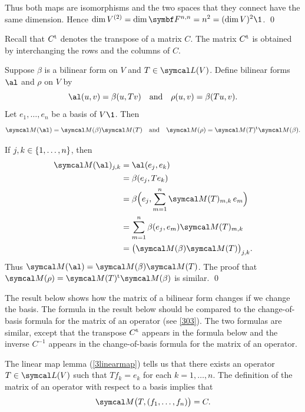 Thus both maps are isomorphisms and the two spaces that they connect have the same dimension. Hence
$\dim V^{(2)} = \dim \F{n,n} = n^2 = (\dim V)^2\1$.
\qed

Recall that $C^{\text{t}}$ denotes the transpose of a matrix $C$. The matrix $C^{\text{t}}$ is obtained by interchanging the rows and the columns of $C$.

{Suppose $\beta$ is a bilinear form on $V$ and $T \in \L(V)$. Define bilinear forms $\al$ and $\rho$ on $V$ by
\[
\al(u,v) = \beta(u, Tv) \andd \rho(u,v) = \beta(Tu, v).
\]
Let $e_1, \ldots, e_n$ be a basis of $V\1$. Then
\[
\M(\al) = \M(\beta) \M(T) \andd \M(\rho) = \tran{\M(T)} \M(\beta).
\]}

\proof
If $j, k \in \{1, \ldots, n\}$, then
\begin{align*}
\M(\al)_{j,k} &= \al(e_j, e_k) \\[1bp]
&= \beta(e_j, Te_k) \\[1bp]
&= \beta\paren[\Big]{ e_j, \sum_{m=1}^n \M(T)_{m,k} \, e_m } \\[1bp]
&= \sum_{m=1}^n \beta(e_j, e_m) \M(T)_{m,k} \\[1bp]
&= \paren[\big]{ \M(\beta) \M(T) }_{j, k}.
\end{align*}
Thus $\M(\al) = \M(\beta) \M(T)$. The proof that $\M(\rho) = \tran{\M(T)} \M(\beta)$ is similar.
\qed

\pagebreak[3]

The result below shows how the matrix of a bilinear form changes if we change the basis. The formula in the result below should be compared to the change-of-basis formula for the matrix of an operator (see \ref{303}). The two formulas are similar, except that the transpose $C^{\text{t}}$ appears in the formula below and the inverse $C^{-1}$ appears in the change-of-basis formula for the matrix of an operator.


\proof
The linear map lemma (\ref{3linearmap}) tells us that there exists an operator $T \in \L(V)$ such that $Tf_k = e_k$ for each
$k = 1, \ldots, n$. The definition of the matrix of an operator with respect to a basis implies that
\[
\M\paren[\big]{ T, (f_1, \ldots, f_n) } = C.
\]

